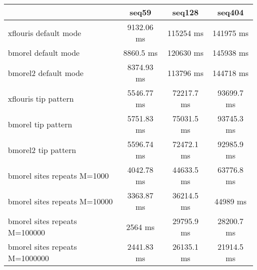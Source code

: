 \begin{tabular}{|l|c|c|c|}
\hline
 & seq59 & seq128 & seq404 \\
\hline
xflouris default mode & 9132.06 ms & 115254 ms & 141975 ms\\
\hline
bmorel default mode & 8860.5 ms & 120630 ms & 145938 ms\\
\hline
bmorel2 default mode & 8374.93 ms & 113796 ms & 144718 ms\\
\hline
xflouris tip pattern & 5546.77 ms & 72217.7 ms & 93699.7 ms\\
\hline
bmorel tip pattern & 5751.83 ms & 75031.5 ms & 93745.3 ms\\
\hline
bmorel2 tip pattern & 5596.74 ms & 72472.1 ms & 92985.9 ms\\
\hline
bmorel sites repeats M=1000 & 4042.78 ms & 44633.5 ms & 63776.8 ms\\
\hline
bmorel sites repeats M=10000 & 3363.87 ms & 36214.5 ms & 44989 ms\\
\hline
bmorel sites repeats M=100000 & 2564 ms & 29795.9 ms & 28200.7 ms\\
\hline
bmorel sites repeats M=1000000 & 2441.83 ms & 26135.1 ms & 21914.5 ms\\
\hline
\end{tabular}
